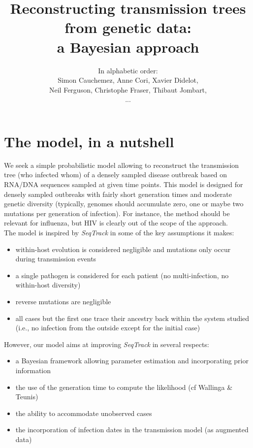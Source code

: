 \documentclass[10pt]{article}
\author{In alphabetic order: \\Simon Cauchemez, Anne Cori, Xavier Didelot, \\Neil Ferguson, Christophe Fraser, Thibaut Jombart,\\...}
\title{Reconstructing transmission trees from genetic data: \\a Bayesian approach}
\begin{document}
\maketitle

\section*{The model, in a nutshell}
We seek a simple probabilistic model allowing to reconstruct the transmission tree (who infected whom) of a densely sampled disease outbreak based on RNA/DNA sequences sampled at given time points.
This model is designed for densely sampled outbreaks with fairly short generation times and moderate genetic diversity (typically, genomes should accumulate zero, one or maybe two mutations per generation of infection).
For instance, the method should be relevant for influenza, but HIV is clearly out of the scope of the approach.
\\

The model is inspired by \textit{SeqTrack} in some of the key assumptions it makes: 
\begin{itemize}
\item within-host evolution is considered negligible and mutations only occur during transmission events
\item a single pathogen is considered for each patient (no multi-infection, no within-host diversity)
\item reverse mutations are negligible
\item all cases but the first one trace their ancestry back within the system studied (i.e., no infection from the outside except for the initial case)
\end{itemize}

However, our model aims at improving \textit{SeqTrack} in several respects:
\begin{itemize}
\item a Bayesian framework allowing parameter estimation and incorporating prior information
\item the use of the generation time to compute the likelihood (cf Wallinga \& Teunis)
\item the ability to accommodate unobserved cases
\item the incorporation of infection dates in the transmission model (as augmented data)
\end{itemize}
\end{document}
